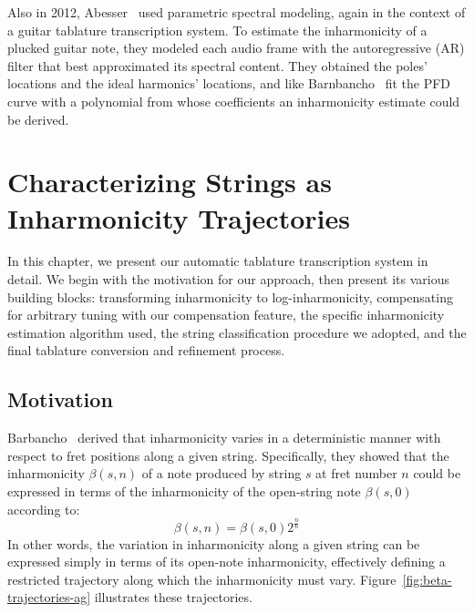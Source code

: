 \documentclass[12pt]{cmuthesis}
\begin{document}
Also in 2012, Abesser~\cite{abesser2012} used parametric spectral modeling, again in the context of a guitar tablature transcription system. To estimate the inharmonicity of a plucked guitar note, they modeled each audio frame with the autoregressive (AR) filter that best approximated its spectral content. They obtained the poles' locations and the ideal harmonics' locations, and like Barnbancho~\cite{barbanchoi2012} fit the PFD curve with a polynomial from whose coefficients an inharmonicity estimate could be derived.



\noindent
\chapter{Characterizing Strings as Inharmonicity Trajectories}
In this chapter, we present our automatic tablature transcription system in detail. We begin with the motivation for our approach, then present its various building blocks: transforming inharmonicity to log-inharmonicity, compensating for arbitrary tuning with our compensation feature, the specific inharmonicity estimation algorithm used, the string classification procedure we adopted, and the final tablature conversion and refinement process.
\section{Motivation}
Barbancho~\cite{barbanchoi2012} derived that inharmonicity varies in a deterministic manner with respect to fret positions along a given string. Specifically, they showed that the inharmonicity $\beta(s,n)$ of a note produced by string $s$ at fret number $n$ could be expressed in terms of the inharmonicity of the open-string note $\beta(s,0)$ according to:
\begin{equation} 
\label{eq:beta-traj}
\beta(s,n) = \beta(s,0)2^{\frac{n}{6}}
\end{equation}
In other words, the variation in inharmonicity along a given string can be expressed simply in terms of its open-note inharmonicity, effectively defining a restricted trajectory along which the inharmonicity must vary. Figure~\ref{fig:beta-trajectories-ag} illustrates these trajectories.
\end{document}
